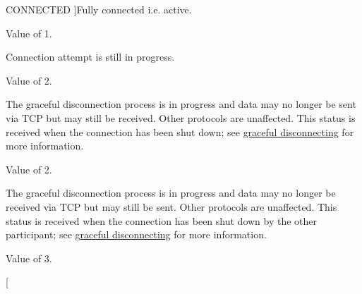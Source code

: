 \begin{Desc}
\begin{description}
{\hypertarget{classcl_networking_utility_a15dd34683154e07d5843f8f5432fec6da91a3fd8751354e5c4f32181268627d9f}{
CONNECTED}
\label{classcl_networking_utility_a15dd34683154e07d5843f8f5432fec6da91a3fd8751354e5c4f32181268627d9f}
}]Fully connected i.e. active. \par
 Value of 1. \item[{\em 
\hypertarget{classcl_networking_utility_a15dd34683154e07d5843f8f5432fec6da8ffcc0a72b9ea4ec527c5bc89c2c890e}{
STILL\_\-CONNECTING}
\label{classcl_networking_utility_a15dd34683154e07d5843f8f5432fec6da8ffcc0a72b9ea4ec527c5bc89c2c890e}
}]Connection attempt is still in progress. \par
 Value of 2. \item[{\em 
\hypertarget{classcl_networking_utility_a15dd34683154e07d5843f8f5432fec6dab8241425bb2dc77be7422346559bbb30}{
NO\_\-SEND}
\label{classcl_networking_utility_a15dd34683154e07d5843f8f5432fec6dab8241425bb2dc77be7422346559bbb30}
}]The graceful disconnection process is in progress and data may no longer be sent via TCP but may still be received. Other protocols are unaffected. This status is received when the connection has been shut down; see \hyperlink{graceful_disconnect_page}{graceful disconnecting} for more information. \par
 Value of 2. \item[{\em 
\hypertarget{classcl_networking_utility_a15dd34683154e07d5843f8f5432fec6daf36e05d04ad267b00184a32d654c3989}{
NO\_\-RECV}
\label{classcl_networking_utility_a15dd34683154e07d5843f8f5432fec6daf36e05d04ad267b00184a32d654c3989}
}]The graceful disconnection process is in progress and data may no longer be received via TCP but may still be sent. Other protocols are unaffected. This status is received when the connection has been shut down by the other participant; see \hyperlink{graceful_disconnect_page}{graceful disconnecting} for more information. \par
 Value of 3. \item[{\em 
}
\end{description}
\end{Desc}
